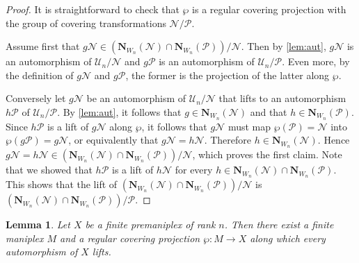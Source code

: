 \documentclass{amsart}
\theoremstyle{plain}
\newtheorem{lemma}[theorem]{Lemma}
\theoremstyle{definition}
\theoremstyle{remark}
\newcommand{\U}{\mathcal U}
\renewcommand{\P}{\mathcal P}
\newcommand{\N}{\mathcal N}
\newcommand{\No}{\mathbf N}
\begin{document}
\begin{proof}
It is straightforward to check that $\wp$ is a regular covering projection with the group of covering
transformations $\N/\P$.

Assume first that $g\N \in (\No_{W_n}(\N)\cap\No_{W_n}(\P))/\N$. Then by \cref{lem:aut}, $g\N$ is an automorphism of $\U_n/\N$
and $g\P$ is an automorphism of $\U_n/\P$. Even more, by the definition of $g\N$ and $g\P$, the former is the projection
of the latter along $\wp$.


Conversely let $g\N$ be an automorphism of $\U_n/\N$ that lifts to an automorphism $h\P$ of $\U_n/\P$. 
By \cref{lem:aut},
it follows that $g \in \No_{W_n}(\N)$ and that $h \in \No_{W_n}(\P)$. Since $h\P$ is a lift of $g\N$ along
$\wp$, it follows that $g\N$ must map $\wp(\P) = \N$ into $\wp(g\P) = g\N$, or 
equivalently that $g\N = h\N$. Therefore $h \in \No_{W_n}(\N)$. Hence $g\N = h\N \in (\No_{W_n}(\N)\cap\No_{W_n}(\P))/\N$,
which proves the first claim.
Note that we showed that $h\P$ is a lift of $h\N$ for every $h \in \No_{W_n}(\N)\cap\No_{W_n}(\P)$. This shows that the lift of $(\No_{W_n}(\N)\cap\No_{W_n}(\P))/\N$ is
$(\No_{W_n}(\N)\cap\No_{W_n}(\P))/\P$.
%
%
%
\end{proof}



\begin{lemma}\label{lem:cover2}
Let $X$ be a finite premaniplex of rank $n$. Then there exist a finite maniplex $M$ and a
regular covering projection $\wp\colon M\rightarrow X$ along which every automorphism of $X$
lifts. 
\end{lemma}
\end{document}
